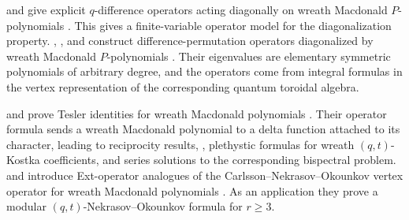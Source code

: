  and  give explicit $q$-difference
operators acting diagonally on wreath Macdonald $P$-polynomials
\cite{OrrShimozono2024}.  This gives a finite-variable operator model for
the diagonalization property.
, , and  construct
difference-permutation operators diagonalized by wreath Macdonald
$P$-polynomials \cite{OrrShimozonoWen2025}.  Their eigenvalues are elementary
symmetric polynomials of arbitrary degree, and the operators come from integral
formulas in the vertex representation of the corresponding quantum toroidal
algebra.

 and  prove Tesler identities
for wreath Macdonald polynomials \cite{RomeroWen2025x}.  Their operator
formula sends a wreath Macdonald polynomial to a delta function attached to
its character, leading to reciprocity results,
\label{wreathInterpolationMacdonaldPolynomial},
plethystic formulas for wreath $(q,t)$-Kostka coefficients, and
series solutions to the corresponding bispectral problem.
 and  introduce
Ext-operator analogues of the Carlsson--Nekrasov--Okounkov vertex operator
for wreath Macdonald polynomials \cite{FerlincWen2025x}.  As an application
they prove a modular $(q,t)$-Nekrasov--Okounkov formula for $r\geq 3$.
